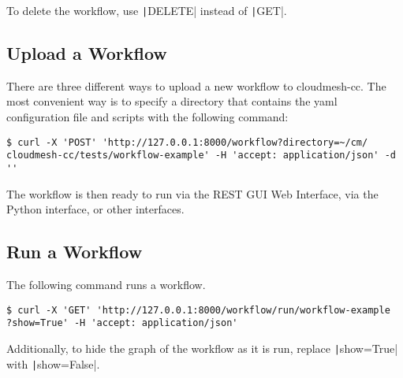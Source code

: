 To delete the workflow, use \texttt|DELETE| instead of \texttt|GET|.

\subsection{Upload a Workflow}\label{upload-a-workflow}

There are three different ways to upload a new workflow to cloudmesh-cc.
The most convenient way is to specify a directory that contains the
yaml configuration file and scripts with the following command:

\begin{verbatim}
$ curl -X 'POST' 'http://127.0.0.1:8000/workflow?directory=~/cm/
cloudmesh-cc/tests/workflow-example' -H 'accept: application/json' -d ''
\end{verbatim}
\smallskip

The workflow is then ready to run via the REST GUI Web Interface,
via the Python interface, or other interfaces.

\subsection{Run a Workflow}\label{run-a-workflow}

The following command runs a workflow.

\begin{verbatim}
$ curl -X 'GET' 'http://127.0.0.1:8000/workflow/run/workflow-example
?show=True' -H 'accept: application/json'
\end{verbatim}

Additionally, to hide the graph of the workflow as it is run,
replace \texttt|show=True| with \texttt|show=False|.

